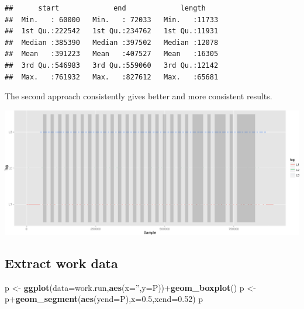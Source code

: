 \documentclass[]{article}
\newenvironment{Shaded}{\begin{snugshade}}{\end{snugshade}}
\newcommand{\KeywordTok}[1]{\textcolor[rgb]{0.13,0.29,0.53}{\textbf{{#1}}}}
\newcommand{\DataTypeTok}[1]{\textcolor[rgb]{0.13,0.29,0.53}{{#1}}}
\newcommand{\DecValTok}[1]{\textcolor[rgb]{0.00,0.00,0.81}{{#1}}}
\newcommand{\FloatTok}[1]{\textcolor[rgb]{0.00,0.00,0.81}{{#1}}}
\newcommand{\StringTok}[1]{\textcolor[rgb]{0.31,0.60,0.02}{{#1}}}
\newcommand{\NormalTok}[1]{{#1}}
\begin{document}
\begin{verbatim}
##      start             end             length     
##  Min.   : 60000   Min.   : 72033   Min.   :11733  
##  1st Qu.:222542   1st Qu.:234762   1st Qu.:11931  
##  Median :385390   Median :397502   Median :12078  
##  Mean   :391223   Mean   :407527   Mean   :16305  
##  3rd Qu.:546983   3rd Qu.:559060   3rd Qu.:12142  
##  Max.   :761932   Max.   :827612   Max.   :65681
\end{verbatim}

The second approach consistently gives better and more consistent
results.

\includegraphics{AnalysisProcedure_files/figure-latex/work_runs_with_markers-1.pdf}

\subsection{Extract work data}\label{extract-work-data}

\begin{Shaded}
\end{Shaded}

\begin{Shaded}
\begin{Highlighting}[]
\NormalTok{p <-}\StringTok{ }\KeywordTok{ggplot}\NormalTok{(}\DataTypeTok{data=}\NormalTok{work.run,}\KeywordTok{aes}\NormalTok{(}\DataTypeTok{x=}\StringTok{''}\NormalTok{,}\DataTypeTok{y=}\NormalTok{P))+}\KeywordTok{geom_boxplot}\NormalTok{()}
\NormalTok{p <-}\StringTok{ }\NormalTok{p+}\KeywordTok{geom_segment}\NormalTok{(}\KeywordTok{aes}\NormalTok{(}\DataTypeTok{yend=}\NormalTok{P),}\DataTypeTok{x=}\FloatTok{0.5}\NormalTok{,}\DataTypeTok{xend=}\FloatTok{0.52}\NormalTok{)}
\NormalTok{p}
\end{Highlighting}
\end{Shaded}
\end{document}
